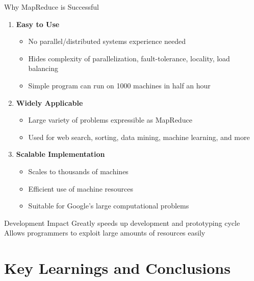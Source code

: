 \documentclass[aspectratio=169]{beamer}
\begin{document}
\begin{frame}{Why MapReduce is Successful}
\begin{enumerate}
    \item \textbf{Easy to Use}
    \begin{itemize}
        \item No parallel/distributed systems experience needed
        \item Hides complexity of parallelization, fault-tolerance, locality, load balancing
        \item Simple program can run on 1000 machines in half an hour
    \end{itemize}

    \vspace{0.2cm}

    \item \textbf{Widely Applicable}
    \begin{itemize}
        \item Large variety of problems expressible as MapReduce
        \item Used for web search, sorting, data mining, machine learning, and more
    \end{itemize}

    \vspace{0.2cm}

    \item \textbf{Scalable Implementation}
    \begin{itemize}
        \item Scales to thousands of machines
        \item Efficient use of machine resources
        \item Suitable for Google's large computational problems
    \end{itemize}
\end{enumerate}

\vspace{0.3cm}

\begin{alertblock}{Development Impact}
Greatly speeds up development and prototyping cycle \\
Allows programmers to exploit large amounts of resources easily
\end{alertblock}
\end{frame}

\section{Key Learnings and Conclusions}
\end{document}
